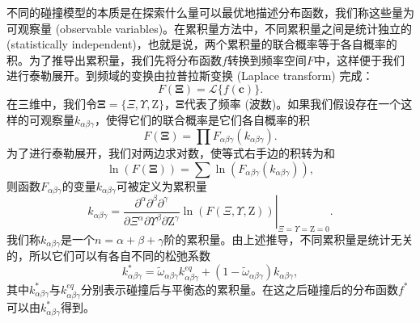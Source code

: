 不同的碰撞模型的本质是在探索什么量可以最优地描述分布函数，我们称这些量为可观察量 (observable variables)。在累积量方法中，不同累积量之间是统计独立的 (statistically independent)，也就是说，两个累积量的联合概率等于各自概率的积。为了推导出累积量，我们先将分布函数$f$转换到频率空间$F$中，这样便于我们进行泰勒展开。到频域的变换由拉普拉斯变换 (Laplace transform) 完成：
\begin{equation}
F(\boldsymbol{\Xi})=\mathcal{L}\{f(\boldsymbol{c})\}.
\end{equation}
在三维中，我们令$\boldsymbol{\Xi}=\{\Xi, \Upsilon, \mathrm{Z}\}$，$\boldsymbol{\Xi}$代表了频率 (波数)。如果我们假设存在一个这样的可观察量$k_{\alpha\beta\gamma}$，使得它们的联合概率是它们各自概率的积
\begin{equation}
F(\boldsymbol{\Xi})=\prod F_{\alpha \beta \gamma}\left(k_{\alpha \beta \gamma}\right).
\end{equation}
为了进行泰勒展开，我们对两边求对数，使等式右手边的积转为和
\begin{equation}
\ln (F(\boldsymbol{\Xi}))=\sum \ln \left(F_{\alpha \beta \gamma}\left(k_{\alpha \beta \gamma}\right)\right),
\end{equation}
则函数$F_{\alpha \beta \gamma}$的变量$k_{\alpha \beta \gamma}$可被定义为累积量
\begin{equation}
k_{\alpha \beta \gamma}=\left. \frac{\partial^{\alpha} \partial^{\beta} \partial^{\gamma}}{\partial \Xi^{\alpha} \partial \Upsilon^{\beta} \partial \mathrm{Z}^{\gamma}} \ln (F(\Xi, \Upsilon, \mathrm{Z}))\right|_{\Xi=\Upsilon=\mathrm{Z}=0}.
\end{equation}
我们称$k_{\alpha \beta \gamma}$是一个$n=\alpha+\beta+\gamma$阶的累积量。由上述推导，不同累积量是统计无关的，所以它们可以有各自不同的松弛系数
\begin{equation}
k_{\alpha \beta \gamma}^{*}=\tilde{\omega}_{\alpha \beta \gamma} k_{\alpha \beta \gamma}^{e q}+\left(1-\tilde{\omega}_{\alpha \beta \gamma}\right) k_{\alpha \beta \gamma},
\end{equation}
其中$k_{\alpha \beta \gamma}^{*}$与$k_{\alpha \beta \gamma}^{eq}$分别表示碰撞后与平衡态的累积量。在这之后碰撞后的分布函数$f^*$可以由$k_{\alpha \beta \gamma}^{*}$得到。

